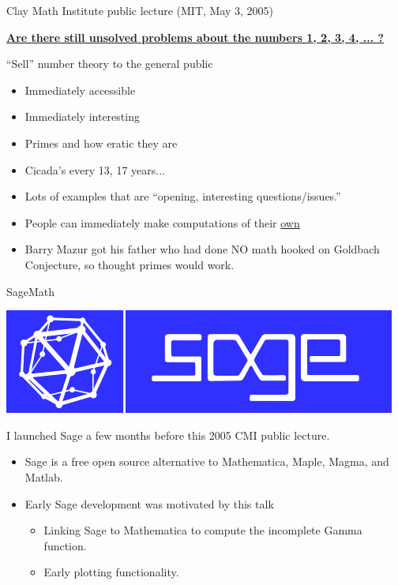 \documentclass{beamer}
\begin{document}
\begin{frame}{Clay Math Institute public lecture (MIT, May 3, 2005)}

  \href{http://www.claymath.org/library/public\_lectures/mazur\_riemann\_hypothesis.pdf}{\bf Are there still unsolved problems about the numbers 1, 2, 3, 4, ... ?}
  \vfill

  \begin{block}{``Sell'' number theory to the general public}
    \begin{itemize}
      \item   Immediately accessible
      \item   Immediately interesting
      \item   Primes and how eratic they are
      \item   Cicada's every 13, 17 years...
      \item   Lots of examples that are ``opening, interesting questions/issues.''
      \item   People can immediately make computations of their \underline{own}
      \item   Barry Mazur got his father who had done NO
            math hooked on Goldbach Conjecture, so thought
            primes would work.
    \end{itemize}
  \end{block}
\end{frame}

\begin{frame}{SageMath}
  \vfill
  \begin{center}
    \includegraphics[width=.7\textwidth]{pics/sage-logo.png}
  \end{center}
  \vfill

  I launched Sage a few months before this 2005 CMI public lecture.
  \begin{itemize}
    \item Sage is a free open source alternative to Mathematica, Maple, Magma, and Matlab.
    \item Early Sage development was motivated by this talk
          \begin{itemize}
            \item Linking Sage to Mathematica to compute the incomplete Gamma function.
            \item Early plotting functionality.
          \end{itemize}
  \end{itemize}
\end{frame}
\end{document}
